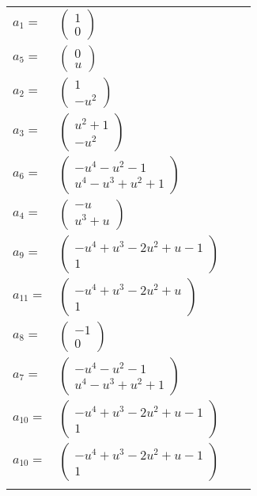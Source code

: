 \documentclass[1p]{elsarticle_modified}
\theoremstyle{definition}
\begin{document}
\begin{tabular}{m{7pt} m{180pt} m{7pt} m{180pt} }
\flushright $a_{1}=$&$\begin{pmatrix}1\\0\end{pmatrix}$ \\
\flushright $a_{5}=$&$\begin{pmatrix}0\\u\end{pmatrix}$ \\
\flushright $a_{2}=$&$\begin{pmatrix}1\\- u^2\end{pmatrix}$ \\
\flushright $a_{3}=$&$\begin{pmatrix}u^2+1\\- u^2\end{pmatrix}$ \\
\flushright $a_{6}=$&$\begin{pmatrix}- u^4- u^2-1\\u^4- u^3+u^2+1\end{pmatrix}$ \\
\flushright $a_{4}=$&$\begin{pmatrix}- u\\u^3+u\end{pmatrix}$ \\
\flushright $a_{9}=$&$\begin{pmatrix}- u^4+u^3-2 u^2+u-1\\1\end{pmatrix}$ \\
\flushright $a_{11}=$&$\begin{pmatrix}- u^4+u^3-2 u^2+u\\1\end{pmatrix}$ \\
\flushright $a_{8}=$&$\begin{pmatrix}-1\\0\end{pmatrix}$ \\
\flushright $a_{7}=$&$\begin{pmatrix}- u^4- u^2-1\\u^4- u^3+u^2+1\end{pmatrix}$ \\
\flushright $a_{10}=$&$\begin{pmatrix}- u^4+u^3-2 u^2+u-1\\1\end{pmatrix}$\\ \flushright $a_{10}=$&$\begin{pmatrix}- u^4+u^3-2 u^2+u-1\\1\end{pmatrix}$\\&\end{tabular}
\end{document}
